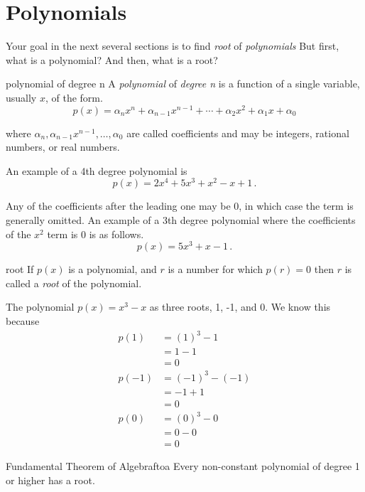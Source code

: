 \section{Polynomials}
\label{sec.general}

Your goal in the next several sections is to find \emph{root} of \emph{polynomials}
But first, what is a polynomial? And then, what is a root?

\begin{definition}{polynomial of degree n}{}
  A \emph{polynomial} of \emph{degree n} is a function of a single variable, usually $x$,
  of the form.
  \[p(x) = \alpha_n x^n + \alpha_{n-1} x^{n-1} + \cdots + \alpha_2 x^2 + \alpha_1 x + \alpha_0 \]

  where $\alpha_n,  \alpha_{n-1} x^{n-1}, \ldots, \alpha_0$ are called coefficients and may be integers, rational numbers, or real numbers.
\end{definition}

An example of a 4th degree polynomial is
\[p(x) = 2 x^4 + 5 x^3 + x^2 - x + 1\,.\]


Any of the coefficients after the leading one may be 0, in which case the term is generally omitted.
An example of a 3th degree polynomial where the coefficients of the $x^2$ term is 0 is as follows.
\[p(x) = 5 x^3 + x - 1\,.\]

\begin{definition}{root}{}
  If $p(x)$ is a polynomial, and $r$ is a number for which $p(r)=0$ then $r$ is called a \emph{root}
  of the polynomial.
\end{definition}

The polynomial $p(x) = x^3 - x$ as three roots, 1, -1, and 0.  We know this because
\begin{align*}
  p(1) &= (1)^3 - 1 \\
  &= 1 - 1 \\
  &= 0\\[3pt]
  p(-1) &= (-1)^3 - (-1) \\
  &= -1 + 1 \\
  &= 0\\[3pt]
  p(0) &= (0)^3 - 0\\
  &= 0 - 0 \\
  &= 0  
\end{align*}

\begin{theorem}{Fundamental Theorem of Algebra}{ftoa}
  Every non-constant polynomial of degree 1 or higher has a root.
\end{theorem}


